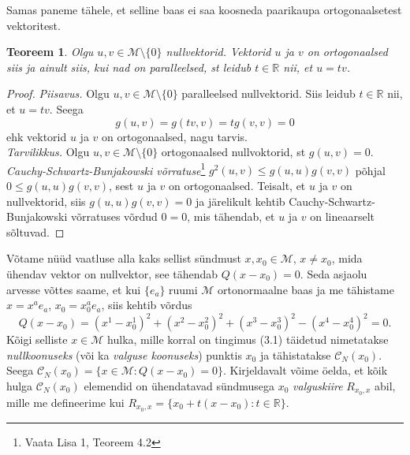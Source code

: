 \documentclass[a4paper,12pt]{article}
\newtheorem{teoreem}{Teoreem}[section]
\numberwithin{equation}{section}
\begin{document}
Samas paneme tähele, et selline baas ei saa koosneda paarikaupa ortogonaalsetest vektoritest.
\begin{teoreem}
Olgu $u, v \in \mathcal{M} \setminus \{0\}$ nullvektorid. Vektorid $u$ ja $v$ on ortogonaalsed siis ja ainult siis, kui nad on paralleelsed, st leidub $t \in \mathbb{R}$ nii, et $u = tv$.
\end{teoreem}
\begin{proof}
\emph{Piisavus.} Olgu $u, v \in \mathcal{M} \setminus \{0\}$ paralleelsed nullvektorid. Siis leidub $t \in \mathbb{R}$ nii, et $u = tv$. Seega
\[g\left(u, v\right) = g \left(tv, v\right) = t g \left(v, v\right) = 0\]
ehk vektorid $u$ ja $v$ on ortogonaalsed, nagu tarvis.
\\
\emph{Tarvilikkus.} Olgu $u, v \in \mathcal{M} \setminus \{0\}$ ortogonaalsed nullvoktorid, st $g \left(u, v\right) = 0$. \emph{Cauchy-Schwartz-Bunjakowski võrratuse}\footnote{Vaata Lisa 1, Teoreem 4.2} $g^2 \left(u, v \right) \leq g \left(u, u \right) g \left(v, v \right)$ põhjal $0 \leq g \left(u, u \right) g \left(v, v \right)$, sest $u$ ja $v$ on ortogonaalsed. Teisalt, et $u$ ja $v$ on nullvektorid, siis $g \left(u, u \right) g \left(v, v \right) = 0$ ja järelikult kehtib Cauchy-Schwartz-Bunjakowski võrratuses võrdud $0 = 0$, mis tähendab, et $u$ ja $v$ on lineaarselt sõltuvad.
\end{proof}

Võtame nüüd vaatluse alla kaks sellist sündmust $x, x_0 \in \mathcal{M}$, $x \neq x_0$, mida ühendav vektor on nullvektor, see tähendab $Q \left(x- x_0\right) = 0$. Seda asjaolu arvesse võttes saame, et kui $\{e_a\}$ ruumi $\mathcal{M}$ ortonormaalne baas ja me tähistame $x = x^a e_a$, $x_0 = x_0^a e_a$, siis kehtib võrdus
\begin{equation}
Q \left(x - x_0\right) = \left(x^1 - x_0^1\right)^2 + \left(x^2 - x_0^2\right)^2 + \left(x^3 - x_0^3\right)^2 - \left(x^4 - x_0^4\right)^2 = 0.
\end{equation}
Kõigi selliste $x \in \mathcal{M}$ hulka, mille korral on tingimus (3.1) täidetud nimetatakse \emph{nullkoonuseks} (või ka \emph{valguse koonuseks}) punktis $x_0$ ja tähistatakse $\mathcal{C}_N\left(x_0\right)$. Seega $\mathcal{C}_N\left(x_0\right) = \{x \in \mathcal{M} : Q \left(x- x_0\right) = 0 \}$. Kirjeldavalt võime öelda, et kõik hulga $\mathcal{C}_N\left(x_0\right)$ elemendid on ühendatavad sündmusega $x_0$ \emph{valguskiire} $R_{x_0, x}$ abil, mille me defineerime kui $R_{x_0, x} = \{x_0 + t\left(x - x_0\right) : t \in \mathbb{R} \}$.
\end{document}
